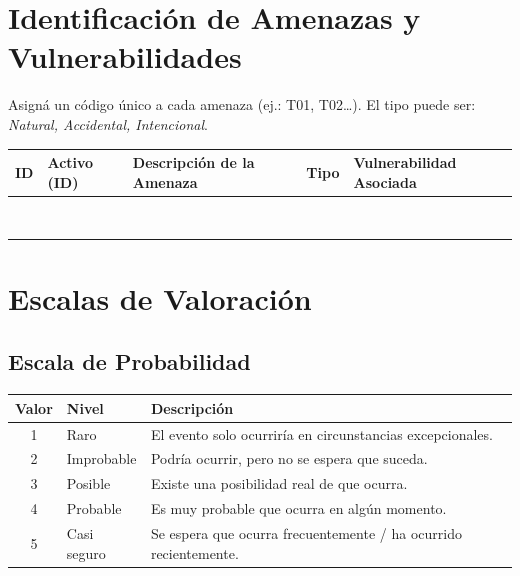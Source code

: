 \documentclass[11pt,a4paper]{article}
\begin{document}
\section{Identificación de Amenazas y Vulnerabilidades}

Asigná un código único a cada amenaza (ej.: T01, T02\ldots). El tipo puede ser: \textit{Natural, Accidental, Intencional}.

\begin{center}
\small
\renewcommand{\arraystretch}{1.6}
\begin{tabularx}{\textwidth}{@{} >{\centering\arraybackslash}p{1cm} >{\centering\arraybackslash}p{1.8cm} X >{\raggedright\arraybackslash}p{2.2cm} X @{}}
\toprule
\textbf{ID} & \textbf{Activo (ID)} & \textbf{Descripción de la Amenaza} & \textbf{Tipo} & \textbf{Vulnerabilidad Asociada} \\
\midrule
 & & & & \\
 & & & & \\
 & & & & \\
 & & & & \\
 & & & & \\
 & & & & \\
 & & & & \\
 & & & & \\
\bottomrule
\end{tabularx}
\end{center}

\section{Escalas de Valoración}\label{sec:escalas}

\subsection{Escala de Probabilidad}

\begin{center}
\renewcommand{\arraystretch}{1.4}
\begin{tabularx}{\textwidth}{@{} c p{2.8cm} X @{}}
\toprule
\textbf{Valor} & \textbf{Nivel} & \textbf{Descripción} \\
\midrule
1 & Raro & El evento solo ocurriría en circunstancias excepcionales. \\
\midrule
2 & Improbable & Podría ocurrir, pero no se espera que suceda. \\
\midrule
3 & Posible & Existe una posibilidad real de que ocurra. \\
\midrule
4 & Probable & Es muy probable que ocurra en algún momento. \\
\midrule
5 & Casi seguro & Se espera que ocurra frecuentemente / ha ocurrido recientemente. \\
\bottomrule
\end{tabularx}
\end{center}
\end{document}
